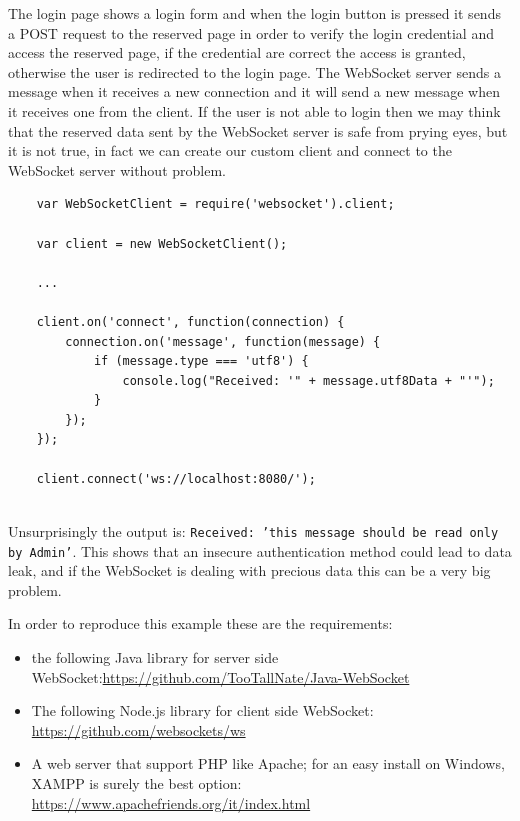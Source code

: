 	The login page shows a login form and when the login button is pressed it sends a POST request to the reserved page in order to verify the login credential and access the reserved page, if the credential are correct the access is granted, otherwise the user is redirected to the login page.\newline
	The WebSocket server sends a message when it receives a new connection and it will send a new message when it receives one from the client.\newline
	If the user is not able to login then we may think that the reserved data sent by the WebSocket server is safe from prying eyes, but it is not true, in fact we can create our custom client and connect to the WebSocket server without problem.\newline
	
	\begin{lstlisting}
	var WebSocketClient = require('websocket').client;
	
	var client = new WebSocketClient();
	
	...
	
	client.on('connect', function(connection) {
		connection.on('message', function(message) {
			if (message.type === 'utf8') {
				console.log("Received: '" + message.utf8Data + "'");
			}
		});
	});
	
	client.connect('ws://localhost:8080/');
	
	\end{lstlisting}
	
	Unsurprisingly the output is:
	\texttt{Received: 'this message should be read only by Admin'}.\newline
	This shows that an insecure authentication method could lead to data leak, and if the WebSocket is dealing with precious data this can be a very big problem.\newline
	
	In order to reproduce this example these are the requirements:
	\begin{itemize}
		\item the following Java library for server side WebSocket:\url{https://github.com/TooTallNate/Java-WebSocket}
		\item The following Node.js library for client side WebSocket: \url{https://github.com/websockets/ws}
		\item A web server that support PHP like Apache; for an easy install on Windows, XAMPP is surely the best option: \url{https://www.apachefriends.org/it/index.html}
	\end{itemize}
	
